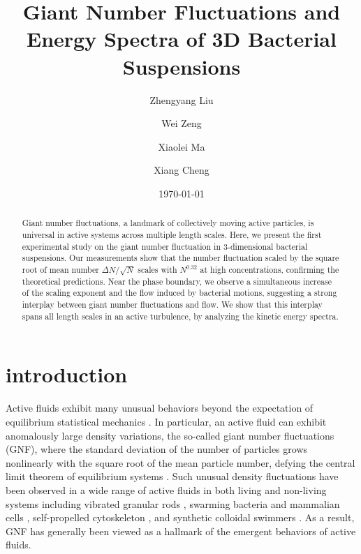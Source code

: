 \documentclass[twocolumn,aps,prx,amsmath,amssymb,longbibliography]{revtex4-2}
\begin{document}
\title{Giant Number Fluctuations and Energy Spectra of 3D Bacterial Suspensions}

\author{Zhengyang Liu}
\author{Wei Zeng}
\author{Xiaolei Ma}
\author{Xiang Cheng}



\date{\today}


\begin{abstract}
Giant number fluctuations, a landmark of collectively moving active particles, is universal in active systems across multiple length scales. Here, we present the first experimental study on the giant number fluctuation in 3-dimensional bacterial suspensions. Our measurements show that the number fluctuation scaled by the square root of mean number $\Delta N / \sqrt N$ scales with $N^{0.32}$ at high concentrations, confirming the theoretical predictions. Near the phase boundary, we observe a simultaneous increase of the scaling exponent and the flow induced by bacterial motions, suggesting a strong interplay between giant number fluctuations and flow. We show that this interplay spans all length scales in an active turbulence, by analyzing the kinetic energy spectra.

\end{abstract}

\maketitle

\section{introduction}

Active fluids exhibit many unusual behaviors beyond the expectation of equilibrium statistical mechanics \cite{Ramaswamy2010,Cates2012,Marchetti2013,Poon2013,Elgeti2015}.
In particular, an active fluid can exhibit anomalously large density variations, the so-called giant number fluctuations (GNF), where the standard deviation of the number of particles grows nonlinearly with the square root of the mean particle number, defying the central limit theorem of equilibrium systems \cite{Mishin2015}.
Such unusual density fluctuations have been observed in a wide range of active fluids in both living and non-living systems including vibrated granular rods \cite{Narayan2007,Aranson2008,Kudrolli2008,Deseigne2010},
swarming bacteria \cite{Zhang2010,Nishiguchi2017} and mammalian cells \cite{Kawaguchi2017},
self-propelled cytoskeleton \cite{Schaller2013}, and synthetic colloidal swimmers \cite{Palacci2013,Karani2019}. As a result, GNF has generally been viewed as a hallmark of the emergent behaviors of active fluids.
\end{document}
